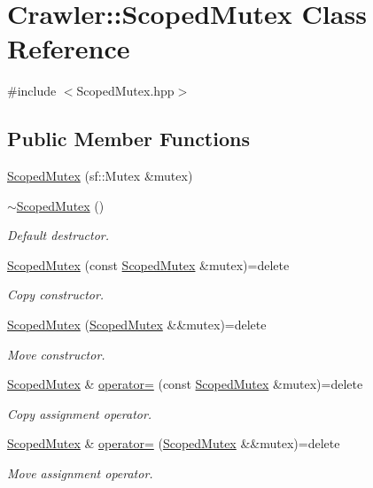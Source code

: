\hypertarget{class_crawler_1_1_scoped_mutex}{}\section{Crawler\+:\+:Scoped\+Mutex Class Reference}
\label{class_crawler_1_1_scoped_mutex}


{\ttfamily \#include $<$Scoped\+Mutex.\+hpp$>$}

\subsection*{Public Member Functions}
\begin{DoxyCompactItemize}
\item 
\hyperlink{class_crawler_1_1_scoped_mutex_a6b2e2965b0a1d13c112520563129c88e}{Scoped\+Mutex} (sf\+::\+Mutex \&mutex)
\item 
\hyperlink{class_crawler_1_1_scoped_mutex_a649848a1592d511b31e98a17845ea1e8}{$\sim$\+Scoped\+Mutex} ()
\begin{DoxyCompactList}\small\item\em Default destructor. \end{DoxyCompactList}\item 
\hyperlink{class_crawler_1_1_scoped_mutex_af0c3a383fed3625154a8308e98057115}{Scoped\+Mutex} (const \hyperlink{class_crawler_1_1_scoped_mutex}{Scoped\+Mutex} \&mutex)=delete
\begin{DoxyCompactList}\small\item\em Copy constructor. \end{DoxyCompactList}\item 
\hyperlink{class_crawler_1_1_scoped_mutex_ac0ce27bf65300ff33198d2c6f5523e5b}{Scoped\+Mutex} (\hyperlink{class_crawler_1_1_scoped_mutex}{Scoped\+Mutex} \&\&mutex)=delete
\begin{DoxyCompactList}\small\item\em Move constructor. \end{DoxyCompactList}\item 
\hyperlink{class_crawler_1_1_scoped_mutex}{Scoped\+Mutex} \& \hyperlink{class_crawler_1_1_scoped_mutex_a82579e0777fc695ac0fc109d46605b79}{operator=} (const \hyperlink{class_crawler_1_1_scoped_mutex}{Scoped\+Mutex} \&mutex)=delete
\begin{DoxyCompactList}\small\item\em Copy assignment operator. \end{DoxyCompactList}\item 
\hyperlink{class_crawler_1_1_scoped_mutex}{Scoped\+Mutex} \& \hyperlink{class_crawler_1_1_scoped_mutex_a0adfa500f85f47ee7975239c009121d5}{operator=} (\hyperlink{class_crawler_1_1_scoped_mutex}{Scoped\+Mutex} \&\&mutex)=delete
\begin{DoxyCompactList}\small\item\em Move assignment operator. \end{DoxyCompactList}\end{DoxyCompactItemize}


